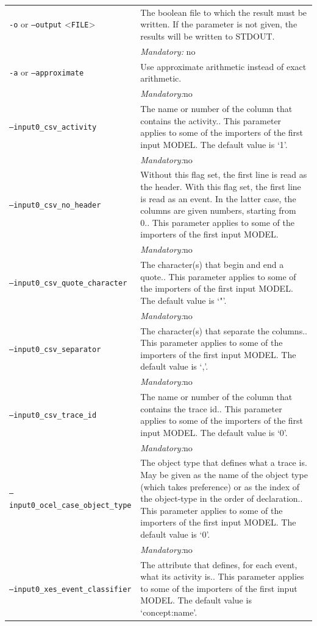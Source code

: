 {\begin{tabularx}{\linewidth}{lX}
\texttt{-o} or \texttt{--output} <\texttt{FILE}> &
The boolean file to which the result must be written. If the parameter is not given, the results will be written to STDOUT.\\
&\textit{Mandatory:} \quad no\\
\texttt{-a} or \texttt{--approximate} & Use approximate arithmetic instead of exact arithmetic.\\
&\textit{Mandatory:}\quad no\\
\texttt{--input0\_csv\_activity} & The name or number of the column that contains the activity.. This parameter applies to some of the importers of the first input MODEL. The default value is `1'.\\
&\textit{Mandatory:}\quad no\\
\texttt{--input0\_csv\_no\_header} & Without this flag set, the first line is read as the header. 
    With this flag set, the first line is read as an event. In the latter case, the columns are given numbers, starting from 0.. This parameter applies to some of the importers of the first input MODEL. \\
&\textit{Mandatory:}\quad no\\
\texttt{--input0\_csv\_quote\_character} & The character(s) that begin and end a quote.. This parameter applies to some of the importers of the first input MODEL. The default value is `"'.\\
&\textit{Mandatory:}\quad no\\
\texttt{--input0\_csv\_separator} & The character(s) that separate the columns.. This parameter applies to some of the importers of the first input MODEL. The default value is `,'.\\
&\textit{Mandatory:}\quad no\\
\texttt{--input0\_csv\_trace\_id} & The name or number of the column that contains the trace id.. This parameter applies to some of the importers of the first input MODEL. The default value is `0'.\\
&\textit{Mandatory:}\quad no\\
\texttt{--input0\_ocel\_case\_object\_type} & The object type that defines what a trace is. May be given as the name of the object type (which takes preference) or as the index of the object-type in the order of declaration.. This parameter applies to some of the importers of the first input MODEL. The default value is `0'.\\
&\textit{Mandatory:}\quad no\\
\texttt{--input0\_xes\_event\_classifier} & The attribute that defines, for each event, what its activity is.. This parameter applies to some of the importers of the first input MODEL. The default value is `concept:name'.\\

\end{tabularx}}
